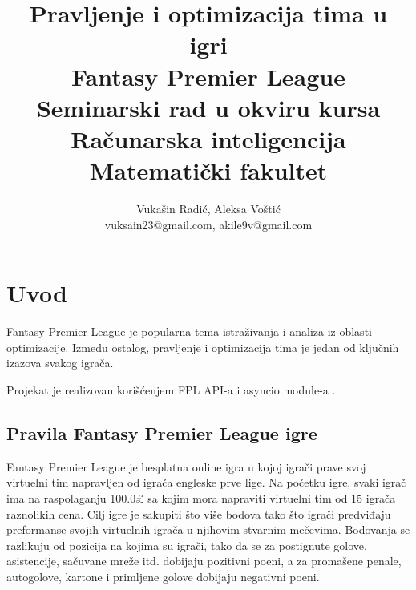 \documentclass[a4paper]{article}
\begin{document}
\title{Pravljenje i optimizacija tima u igri \\
Fantasy Premier League \\ 
\vspace{2mm} \small {Seminarski rad u okviru kursa\\Računarska inteligencija\\ Matematički fakultet}}

\author{Vukašin Radić, Aleksa Voštić\\ vuksain23@gmail.com, akile9v@gmail.com}



\maketitle



\tableofcontents

\newpage




\section{Uvod}
\label{sec:uvod}

Fantasy Premier League je popularna tema istraživanja i analiza iz oblasti optimizacije. Između ostalog, pravljenje i optimizacija tima je jedan od ključnih izazova svakog igrača.

Projekat je realizovan korišćenjem FPL API-a \cite{pythonWrapper} i asyncio module-a \cite{pythonAsyncio}.

\subsection{Pravila Fantasy Premier League igre}
\vspace{3mm}
\label{sec:pravila}
Fantasy Premier League je besplatna online igra u kojoj igrači prave svoj virtuelni tim napravljen od igrača engleske prve lige. Na početku igre, svaki igrač ima na raspolaganju 100.0£ sa kojim mora napraviti virtuelni tim od 15 igrača raznolikih cena. Cilj igre je sakupiti što više bodova tako što igrači predviđaju preformanse svojih virtuelnih igrača u njihovim stvarnim mečevima. Bodovanja se razlikuju od pozicija na kojima su igrači, tako da se za postignute golove, asistencije, sačuvane mreže itd. dobijaju pozitivni poeni, a za promašene penale, autogolove, kartone i primljene golove dobijaju negativni poeni. \\
\end{document}
